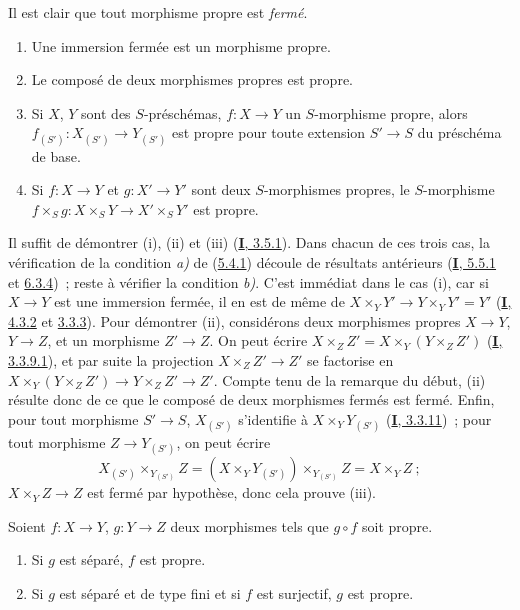 Il est clair que tout morphisme propre est \emph{fermé}.

\begin{proposition}[5.4.2]
\label{II.5.4.2-fr}
\begin{enumerate}
  \item[\rm{(i)}] Une immersion fermée est un morphisme propre.
  \item[\rm{(ii)}] Le composé de deux morphismes propres est propre.
  \item[\rm{(iii)}] Si $X$, $Y$ sont des $S$-préschémas,
  $f:X\to Y$ un $S$-morphisme propre, alors
  $f_{(S')}:X_{(S')}\to Y_{(S')}$ est propre pour toute extension
  $S'\to S$ du préschéma de base.
  \item[\rm{(iv)}] Si $f:X\to Y$ et $g:X'\to Y'$ sont deux $S$-morphismes
  propres, le $S$-morphisme
  $f\times_Sg:X\times_SY\to X'\times_SY'$ est propre.
\end{enumerate}
\end{proposition}


Il suffit de démontrer (i), (ii) et (iii) (\hyperref[I.3.5.1-fr]{\textbf{I}, 3.5.1}).
Dans chacun de ces trois cas, la vérification de la condition \emph{a)} de
(\hyperref[II.5.4.1-fr]{5.4.1}) découle de résultats antérieurs
(\hyperref[I.5.5.1-fr]{\textbf{I}, 5.5.1} et \hyperref[I.6.3.4-fr]{6.3.4})~; reste à
vérifier la condition \emph{b)}. C'est immédiat dans le cas (i), car si $X\to Y$
est une immersion fermée, il en est de même de
$X\times_YY'\to Y\times_YY'=Y'$ (\hyperref[I.4.3.2-fr]{\textbf{I}, 4.3.2} et
\hyperref[II.3.3.3-fr]{3.3.3}). Pour démontrer (ii), considérons deux
morphismes propres $X\to Y$, $Y\to Z$, et un morphisme $Z'\to Z$. On peut
écrire $X\times_ZZ'=X\times_Y(Y\times_ZZ')$
(\hyperref[I.3.3.9.1-fr]{\textbf{I}, 3.3.9.1}), et par suite la projection
$X\times_ZZ'\to Z'$ se factorise en
$X\times_Y(Y\times_ZZ')\to Y\times_ZZ'\to Z'$. Compte tenu de la remarque
du début, (ii) résulte donc de ce que le composé de deux morphismes fermés
est fermé. Enfin, pour tout morphisme $S'\to S$, $X_{(S')}$ s'identifie à
$X\times_YY_{(S')}$ (\hyperref[I.3.3.11-fr]{\textbf{I}, 3.3.11})~; pour tout
morphisme $Z\to Y_{(S')}$, on peut écrire
\[
  X_{(S')}\times_{Y_{(S')}}Z
  =(X\times_YY_{(S')})\times_{Y_{(S')}}Z=X\times_YZ~;
\]
$X\times_YZ\to Z$ est fermé par hypothèse, donc cela prouve (iii).

\begin{corollary}[5.4.3]
\label{II.5.4.3-fr}
Soient $f:X\to Y$, $g:Y\to Z$ deux morphismes tels que $g\circ f$ soit
propre.
\begin{enumerate}
  \item[\rm{(i)}] Si $g$ est séparé, $f$ est propre.
  \item[\rm{(ii)}] Si $g$ est séparé et de type fini et si $f$ est
  surjectif, $g$ est propre.
\end{enumerate}
\end{corollary}


